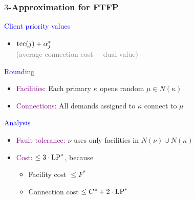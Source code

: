 \documentclass[hyperref,dvipsnames,svgnames]{beamer}
\begin{document}
\begin{frame}
  \frametitle{$3$-Approximation for FTFP}

{\large

\textcolor{blue}{Client priority values}	
	
	\begin{itemize}
		\item $\mbox{\rm{tcc}}(j) + \alpha_j^\ast$
		\\
		{\normalsize \textcolor{gray}{(average connection cost + dual value)}}
	\end{itemize}
	
\textcolor{blue}{Rounding}

  	\begin{itemize}
  	\item \textcolor{purple}{Facilities:}
 					Each primary $\kappa$ opens random $\mu\in N(\kappa)$
  	\item \textcolor{purple}{Connections:}
 					All demands assigned to $\kappa$ connect to $\mu$
  	\end{itemize}

\textcolor{blue}{Analysis}

  \begin{itemize}
  	\item \textcolor{purple}{Fault-tolerance:}
 			$\nu$ uses only facilities in $N(\nu) \cup N(\kappa)$
  	\item \textcolor{purple}{Cost:} $\le 3\cdot\mbox{\rm LP}^\ast$, because
    	\begin{itemize}
    		\item Facility cost $\le F^\ast$
    		\item Connection cost $\le C^\ast + 2\cdot\mbox{\rm LP}^\ast$
    	\end{itemize}
 	\end{itemize}
}
\end{frame}

\end{document}

